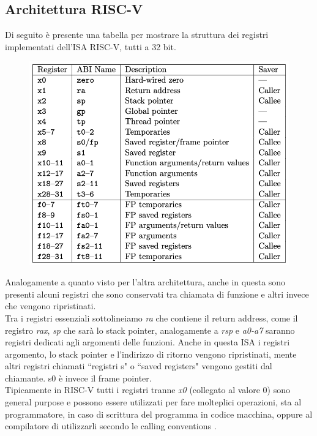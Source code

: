 \subsection*{Architettura RISC-V}
Di seguito è presente una tabella per mostrare la struttura dei registri implementati dell'ISA RISC-V, tutti a 32 bit.
\vspace{1cm}
\FloatBarrier
\begin{figure}[!htbp]
    \centering
    \includegraphics[width=0.7\linewidth]{images/riscv-registers.png}
\end{figure}
\FloatBarrier
\vspace{1cm}
Analogamente a quanto visto per l'altra architettura, anche in questa sono presenti alcuni registri che sono conservati tra chiamata di funzione e altri invece che vengono ripristinati.\\
Tra i registri essenziali sottolineiamo \textit{ra} che contiene il return address, come il registro \textit{rax}, \textit{sp} che sarà lo stack pointer, analogamente a \textit{rsp} e \textit{a0-a7} saranno registri dedicati agli argomenti delle funzioni. Anche in questa ISA i registri argomento, lo stack pointer e l'indirizzo di ritorno vengono ripristinati, mente altri registri chiamati ``registri s" o ``saved registers" vengono gestiti dal chiamante. s0 è invece il frame pointer.\\
\newline
Tipicamente in RISC-V tutti i registri tranne \textit{x0} (collegato al valore 0) sono general purpose e possono essere utilizzati per fare molteplici operazioni, sta al programmatore, in caso di scrittura del programma in codice macchina, oppure al compilatore di utilizzarli secondo le calling conventions \cite{RISCV}.\\
\newline
